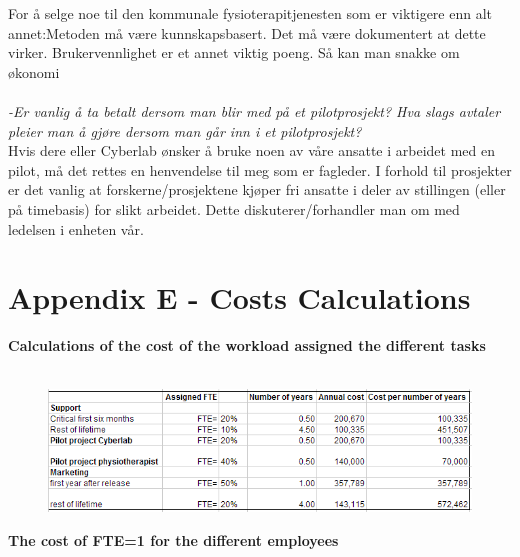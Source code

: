 For å selge noe til den kommunale fysioterapitjenesten som er viktigere enn alt annet:Metoden må være kunnskapsbasert. Det må være dokumentert at dette virker. Brukervennlighet er et annet viktig poeng. Så kan man snakke om økonomi \\ \\
\emph{-Er vanlig å ta betalt dersom man blir med på et pilotprosjekt? Hva slags avtaler pleier man å gjøre dersom man går inn i et pilotprosjekt?}\\ 
Hvis dere eller Cyberlab ønsker å bruke noen av våre ansatte i arbeidet med en pilot, må det rettes en henvendelse til meg som er fagleder. I forhold til prosjekter er det vanlig at forskerne/prosjektene kjøper fri ansatte i deler av stillingen (eller på timebasis) for slikt  arbeidet. Dette diskuterer/forhandler man om med ledelsen i enheten vår.

\newpage
\section*{Appendix E - Costs Calculations}
\label{E}

\textbf{Calculations of the cost of the workload assigned the different tasks} \\ \\

\begin{figure}[h]
\begin{center}
\includegraphics[scale=0.8]{calcFTE}
\label{fig:fte}
\end{center}
\end{figure}
\bigskip
\bigskip
\bigskip
\bigskip
\bigskip
\bigskip
\bigskip
\bigskip
\bigskip
\bigskip
\bigskip
\bigskip
\bigskip
\bigskip
\bigskip
\textbf{The cost of FTE=1 for the different employees} \\ \\

